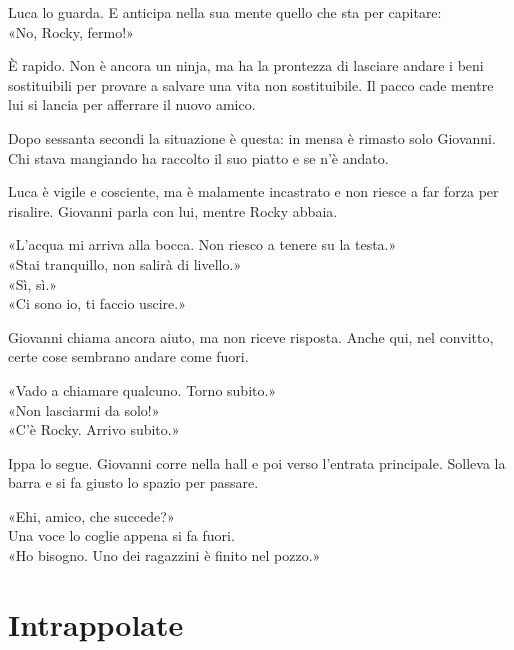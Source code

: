 \documentclass[10pt,oneside]{extbook}
\begin{document}
\par\medskip
Luca lo guarda. E anticipa nella sua mente quello che sta per capitare:\\
«No, Rocky, fermo!»

\par\medskip
\`E rapido. Non \`e ancora un ninja, ma ha la prontezza di lasciare andare i beni sostituibili per provare a salvare una vita non sostituibile.
Il pacco cade mentre lui si lancia per afferrare il nuovo amico.

\par\medskip
Dopo sessanta secondi la situazione \`e questa: in mensa \`e rimasto solo Giovanni.
Chi stava mangiando ha raccolto il suo piatto e se n’\`e andato.

\par\medskip
Luca \`e vigile e cosciente, ma \`e malamente incastrato e non riesce a far forza per risalire.
Giovanni parla con lui, mentre Rocky abbaia.

\par\medskip
«L'acqua mi arriva alla bocca. Non riesco a tenere su la testa.»\\
«Stai tranquillo, non salirà di livello.»\\
«Sì, sì.»\\
«Ci sono io, ti faccio uscire.»
\par\medskip
Giovanni chiama ancora aiuto, ma non riceve risposta. Anche qui, nel convitto, certe cose sembrano andare come fuori.

\par\medskip
«Vado a chiamare qualcuno. Torno subito.»\\
«Non lasciarmi da solo!»\\
«C’\`e Rocky. Arrivo subito.»

\par\medskip
Ippa lo segue. Giovanni corre nella hall e poi verso l’entrata principale.
Solleva la barra e si fa giusto lo spazio per passare.

\par\medskip
«Ehi, amico, che succede?»\\
Una voce lo coglie appena si fa fuori.\\
«Ho bisogno. Uno dei ragazzini \`e finito nel pozzo.»
\clearpage{}
\clearpage{}\chapter{Intrappolate}
\end{document}
